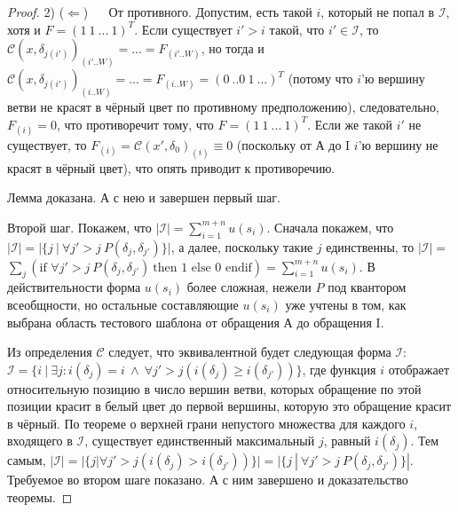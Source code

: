 \begin{proof}
   2) ($\Leftarrow$) ~~  От противного. Допустим, есть такой $i$, который не попал в $\mathcal{I}$, хотя и $F = (1~1~...~1)^T$. Если существует $i' > i$ такой, что $i' \in \mathcal{I}$, то $\mathcal{C}(x, \delta_{j(i')})_{(i'..W)} = ... = F_{(i'..W)}$, но тогда и  $\mathcal{C}(x, \delta_{j(i')})_{(i..W)} = ... = F_{(i..W)} = (0~..0~1~...)^T$ (потому что $i$'ю вершину ветви не красят в чёрный цвет по противному предположению), следовательно, $F_{(i)} = 0$, что противоречит тому, что $F = (1~1~...~1)^T$. Если же такой $i'$ не существует, то $F_{(i)} = \mathcal{C}(x', \delta_0)_{(i)} \equiv 0$ (поскольку от А до I $i$'ю вершину не красят в чёрный цвет), что опять приводит к противоречию.
   
   Лемма доказана. А с нею и завершен первый шаг.
   
   Второй шаг. Покажем, что $|\mathcal{I}| = \sum_{i=1}^{m+n} u(s_i)$. Сначала покажем, что $|\mathcal{I}| = |\{ j ~|~ \forall j' {>} j ~ P(\delta_j, \delta_{j'}) \}|$, а далее, поскольку такие $j$ единственны, то $|\mathcal{I}| =$\\ $\sum_j (\mbox{if~} \forall j' {>} j ~ P(\delta_j, \delta_{j'}) ~\mbox{then 1 else 0 endif}) =  \sum_{i=1}^{m+n} u(s_i)$. В действительности форма $u(s_i)$ более сложная, нежели $P$ под квантором всеобщности, но остальные составляющие $u(s_i)$ уже учтены в том, как выбрана область тестового шаблона от обращения А до обращения I.
   
   Из определения $\mathcal{C}$ следует, что эквивалентной будет следующая форма $\mathcal{I}$: $\mathcal{I} = \{i ~|~ \exists j : i(\delta_j) = i ~\wedge~ \forall j' > j ( i(\delta_j) \geqslant i(\delta_{j'}) ) \}$, где функция $i$ отображает относительную позицию в число вершин ветви, которых обращение по этой позиции красит в белый цвет до первой вершины, которую это обращение красит в чёрный. По теореме о верхней грани непустого множества для каждого $i$, входящего в $\mathcal{I}$, существует единственный максимальный $j$, равный $i(\delta_j)$. Тем самым, $|\mathcal{I}| = |\{j | \forall j' > j ( i(\delta_j) > i(\delta_{j'}) ) \}| = |\{ j ~|~ \forall j' {>} j ~ P(\delta_j, \delta_{j'}) \}|$. Требуемое во втором шаге показано. А с ним завершено и доказательство теоремы.
\end{proof}